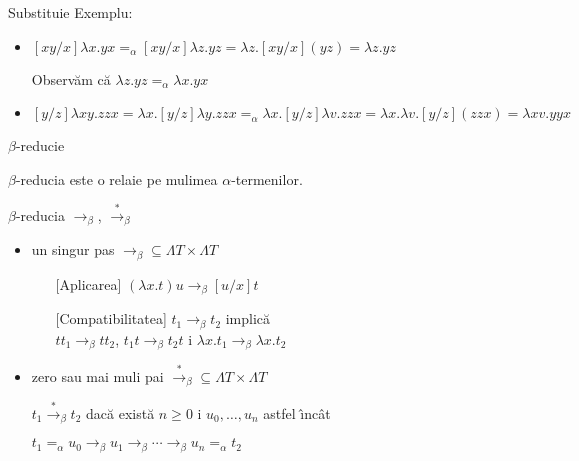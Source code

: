 \documentclass[xcolor=pdftex,romanian,colorlinks]{beamer}
\newcommand{\ra}{\rightarrow}
\newcommand{\sra}{\stackrel{*}{\rightarrow}}
\begin{document}
\begin{frame}{Substitu\ts ie}
Exemplu:
\begin{itemize}
\item $[xy/x]\lambda x. yx =_\alpha [xy/x]\lambda z.yz =\lambda z. [xy/x](yz)=\lambda z. yz$

\medskip

Observ\u am  c\u a $\lambda z. yz =_\alpha \lambda x.yx$\pause

\pause\bigskip

\item $[y/z]\lambda xy. zzx =\lambda x. [y/z]\lambda y. zzx=_\alpha
\lambda x.[y/z]\lambda v. zzx=\lambda x.\lambda v. [y/z](zzx)=\lambda xv. yyx$
\end{itemize}
\end{frame}

\begin{frame}[fragile]{$\beta$-reduc\ts ie}

$\beta$-reduc\ts ia este o rela\ts ie pe mul\ts imea $\alpha$-termenilor. 

\begin{block}{$\beta$-reduc\ts ia $\ra_\beta$, $\sra_\beta$}
\begin{itemize}
\item un singur pas
 $\ra_\beta\subseteq \Lambda T\times \Lambda T$
 
 \begin{itemize}
 \item[][Aplicarea] $(\lambda x.t)u\ra_\beta [u/x]t$ 
 \item[][Compatibilitatea] $t_1\ra_\beta t_2$ implic\u a \\ 
 \hspace*{3cm} $tt_1\ra_\beta tt_2$, $t_1t\ra_\beta t_2t$ \sh i 
 $\lambda x.t_1\ra_\beta\lambda x.t_2$
 \end{itemize}

\item zero sau mai mul\ts i pa\sh i  $\sra_\beta\subseteq \Lambda T\times \Lambda T$

$t_1\sra_\beta  t_2$ dac\u a  exist\u a $n\geq 0$ \sh i $u_0,\ldots, u_n$ astfel \^{\i}nc\^{a}t

$t_1=_\alpha u_0\ra_\beta u_1\ra_\beta\cdots\ra_\beta u_n =_\alpha t_2$
\end{itemize}
\end{block}
\end{frame}
\end{document}
